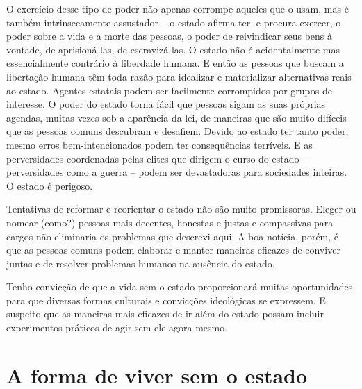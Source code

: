 O exercício desse tipo de poder não apenas corrompe aqueles que o usam, mas é também intrinsecamente assustador -- o estado afirma ter, e procura exercer, o poder sobre a vida e a morte das pessoas, o poder de reivindicar seus bens à vontade, de aprisioná-las, de escravizá-las. O estado não é acidentalmente mas essencialmente contrário à liberdade humana. E então as pessoas que buscam a libertação humana têm toda razão para idealizar e materializar alternativas reais ao estado. Agentes estatais podem ser facilmente corrompidos por grupos de interesse. O poder do estado torna fácil que pessoas sigam as suas próprias agendas, muitas vezes sob a aparência da lei, de maneiras que são muito difíceis que as pessoas comuns descubram e desafiem. Devido ao estado ter tanto poder, mesmo erros bem-intencionados podem ter consequências terríveis. E as perversidades coordenadas pelas elites que dirigem o curso do estado -- perversidades como a guerra -- podem ser devastadoras para sociedades inteiras. O estado é perigoso.

Tentativas de reformar e reorientar o estado não são muito promissoras. Eleger ou nomear (como?) pessoas mais decentes, honestas e justas e compassivas para cargos não eliminaria os problemas que descrevi aqui. A boa notícia, porém, é que as pessoas comuns podem elaborar e manter maneiras eficazes de conviver juntas e de resolver problemas humanos na ausência do estado.

Tenho convicção de que a vida sem o estado proporcionará muitas oportunidades para que diversas formas culturais e convicções ideológicas se expressem. E suspeito que as maneiras mais eficazes de ir além do estado possam incluir experimentos práticos de agir sem ele agora mesmo.

\section{A forma de viver sem o estado}


